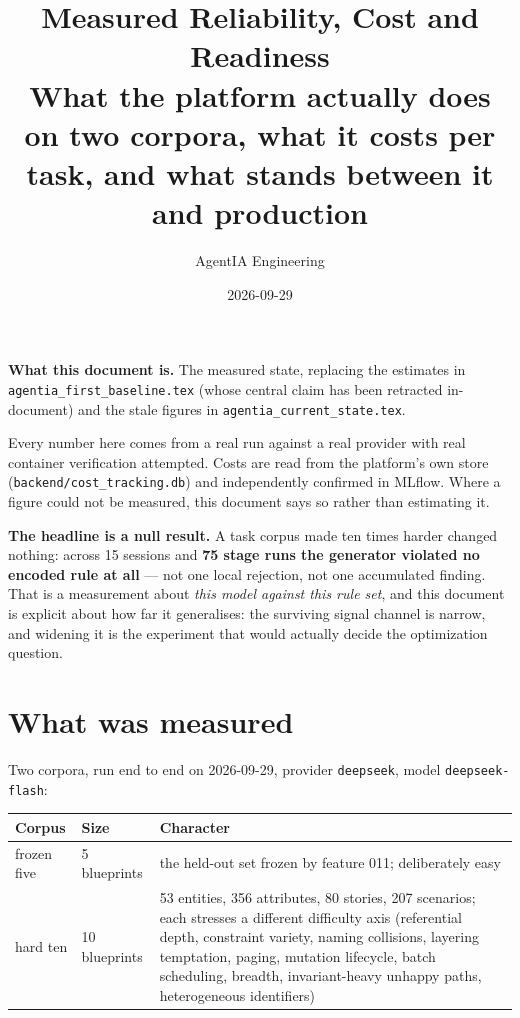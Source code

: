 \documentclass[11pt,a4paper]{article}
\title{\vspace{-1.4cm}\textbf{Measured Reliability, Cost and Readiness}\\[0.25cm]
\large What the platform actually does on two corpora, what it costs per task, and
what stands between it and production}
\author{AgentIA Engineering}
\date{2026-09-29}
\begin{document}
\maketitle
\thispagestyle{fancy}

\begin{notebox}
\textbf{What this document is.} The measured state, replacing the estimates in
\texttt{agentia\_first\_baseline.tex} (whose central claim has been retracted
in-document) and the stale figures in \texttt{agentia\_current\_state.tex}.

Every number here comes from a real run against a real provider with real container
verification attempted. Costs are read from the platform's own store
(\texttt{backend/cost\_tracking.db}) and independently confirmed in MLflow. Where a
figure could not be measured, this document says so rather than estimating it.

\textbf{The headline is a null result.} A task corpus made ten times harder changed
nothing: across 15 sessions and \textbf{75 stage runs the generator violated no
encoded rule at all} --- not one local rejection, not one accumulated finding. That is
a measurement about \emph{this model against this rule set}, and this document is
explicit about how far it generalises: the surviving signal channel is narrow, and
widening it is the experiment that would actually decide the optimization question.
\end{notebox}

\tableofcontents
\vspace{0.5cm}

\section{What was measured}

Two corpora, run end to end on 2026-09-29, provider \texttt{deepseek}, model
\texttt{deepseek-flash}:

\begin{center}
\begin{tabular}{@{}p{}p{}p{}@{}}
\toprule
\textbf{Corpus} & \textbf{Size} & \textbf{Character} \\
\midrule
frozen five & 5 blueprints & the held-out set frozen by feature 011; deliberately
easy \\
hard ten & 10 blueprints & 53 entities, 356 attributes, 80 stories, 207 scenarios;
each stresses a different difficulty axis (referential depth, constraint variety,
naming collisions, layering temptation, paging, mutation lifecycle, batch
scheduling, breadth, invariant-heavy unhappy paths, heterogeneous identifiers) \\
\bottomrule
\end{tabular}
\end{center}
\end{document}
